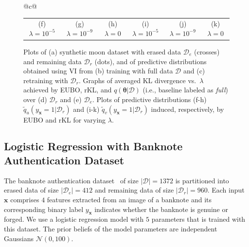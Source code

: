 \documentclass{article}
\theoremstyle{definition}
\newcommand{\todo}[1]{}
\newcommand{\mbf}[1]{\mathbf{#1}}
\newcommand{\mcl}[1]{\mathcal{#1}}
\newcommand{\da}{\mcl{D}}
\newcommand{\dc}{\mcl{D}_r}
\newcommand{\dr}{\mcl{D}_e}
\newcommand{\eubo}{\tilde{q}_u}
\newcommand{\elbo}{\tilde{q}_v}
\begin{document}
\begin{figure}
\begin{tabular}{@{}c@{}}
\begin{tabular}{@{}c@{}c@{}c@{}|@{}c@{}c@{}c@{}}
    \\
    (f) $\lambda = 10^{-5}$
    &
    (g) $\lambda = 10^{-9}$
    &
    (h) $\lambda = 0$
    &
    (i) $\lambda = 10^{-5}$
    &
    (j) $\lambda = 10^{-9}$
    &
    (k) $\lambda = 0$
    \end{tabular}
\end{tabular}\vspace{-0.7mm}
\caption{Plots of (a) synthetic moon dataset with erased data $\dr$ (crosses) and remaining data $\dc$ (dots), and of predictive distributions %
obtained using VI from (b) training with full data $\da$ and (c) retraining with $\dc$.
Graphs of averaged KL divergence vs.~$\lambda$ achieved by EUBO, rKL, and $q(\bm{\theta}|\da)$ (i.e., baseline labeled as \emph{full}) over (d) $\dc$ and (e) $\dr$. Plots of predictive distributions (f-h) $\eubo(y_{\mbf{x}}=1|\dc)$ and (i-k) $\elbo(y_{\mbf{x}}=1|\dc)$ induced, respectively, by EUBO and rKL for varying $\lambda$.
}
\label{fig:moon}\vspace{-0.6mm}
\end{figure}
%
\subsection{Logistic Regression with Banknote Authentication Dataset}%
\label{subsec:experimentbanknote}
%
\todo{structure of the IAF}
The banknote authentication dataset~\cite{Dua:2019} of size $|\da|=1372$
is partitioned into erased data of size $|\dr|=412$ and remaining data of size $|\dc|=960$.
Each input $\mbf{x}$ comprises $4$ features extracted from an image of a banknote and its corresponding binary label $y_\mbf{x}$ indicates whether the banknote is genuine or forged. 
We use a logistic regression model with $5$ parameters that is trained with this dataset. The prior beliefs of the model parameters are independent Gaussians $\mcl{N}(0,100)$. 
\end{document}
